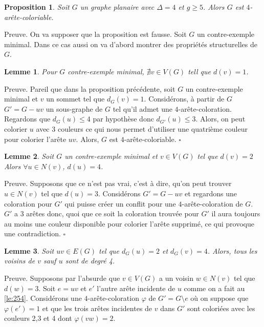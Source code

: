 \documentclass[10pt,a4paper]{article}
\newtheorem{proposition}{Proposition}
\newtheorem{lemme}{Lemme}
\newcommand{\ep}{{\hfill $\square$}}
\begin{document}
\begin{proposition}
Soit $G$ un graphe planaire avec $\Delta = 4$ et $g \geq 5$. Alors $G$ est $4$-arête-coloriable.
\end{proposition}

Preuve. On va supposer que la proposition est fausse. Soit $G$ un contre-exemple minimal. Dans ce cas aussi on va d'abord montrer des propriétés structurelles de $G$.

\begin{lemme}
Pour $G$ contre-exemple minimal,  $\nexists v \in V(G)$ tell que $d(v) = 1$.
\end{lemme}

Preuve.
Pareil que dans la proposition précédente, soit $G$ un contre-exemple minimal et $v$ un sommet tel que $d_G(v) = 1$. Considérons, à partir de $G$ $G' = G-uv$ un sous-graphe de $G$ tel qu'il admet une $4$-arête-coloration. Regardons que $d_G(u) \leq 4$ par hypothèse donc $d_{G'}(u) \leq 3$. Alors, on peut colorier $u$ avec $3$ couleurs ce qui nous permet d'utiliser une quatrième couleur pour colorier l'arête $uv$. Alors, $G$ est $4$-arête-coloriable.
\ep

\begin{lemme}
Soit $G$ un contre-exemple minimal et $v \in V(G)$ tel que $d(v) = 2$ Alors $\forall u \in N(v)$, $d(u) = 4$.
\label{le:23}
\end{lemme} 

Preuve.
Supposons que ce n'est pas vrai, c'est à dire, qu'on peut trouver $u \in N(v)$ tel que $d(u) = 3$. Considérons $G' = G-uv$ et regardons une coloration pour $G'$ qui puisse créer un conflit pour une $4$-arête-coloration de $G$. $G'$ a 3 arêtes donc, quoi que ce soit la coloration trouvée pour $G'$ il aura toujours au moins une couleur disponible pour colorier l'arête supprimé, ce qui provoque une contradiction.
\ep

\begin{lemme}
Soit $uv \in E(G)$ tel que $d_G(u) = 2$ et $d_G(v) = 4$. Alors, tous les voisins de $v$ sauf $u$ sont de degré 4.
\label{le:243}
\end{lemme}

Preuve.
Supposons par l'absurde que $v \in V(G)$ a un voisin $w \in N(v)$ tel que $d(w) = 3$. Soit $e = uv$ et $e'$ l'autre arête incidente de $u$ comme on a fait au \ref{le:254}. Considérons une $4$-arête-coloration $\varphi$ de $G' = G \setminus e$  où on suppose que $\varphi(e') = 1$ et que les trois arêtes incidentes de $v$ dans $G'$ sont coloriées avec les couleurs 2,3 et 4 dont $\varphi(vw) = 2$. 
\end{document}

